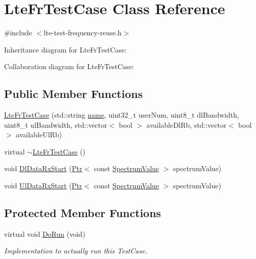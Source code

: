 \hypertarget{classLteFrTestCase}{}\section{Lte\+Fr\+Test\+Case Class Reference}
\label{classLteFrTestCase}


{\ttfamily \#include $<$lte-\/test-\/frequency-\/reuse.\+h$>$}



Inheritance diagram for Lte\+Fr\+Test\+Case\+:


Collaboration diagram for Lte\+Fr\+Test\+Case\+:
\subsection*{Public Member Functions}
\begin{DoxyCompactItemize}
\item 
\hyperlink{classLteFrTestCase_ad2462a22e785220a21669d13471669bc}{Lte\+Fr\+Test\+Case} (std\+::string \hyperlink{generate__test__data__lte__spectrum__model_8m_ab74e6bf80237ddc4109968cedc58c151}{name}, uint32\+\_\+t user\+Num, uint8\+\_\+t dl\+Bandwidth, uint8\+\_\+t ul\+Bandwidth, std\+::vector$<$ bool $>$ available\+Dl\+Rb, std\+::vector$<$ bool $>$ available\+Ul\+Rb)
\item 
virtual \hyperlink{classLteFrTestCase_a5cb1b198965df955d24cfa459cb40780}{$\sim$\+Lte\+Fr\+Test\+Case} ()
\item 
void \hyperlink{classLteFrTestCase_a01a287862bb43a1903601d6bab39eba9}{Dl\+Data\+Rx\+Start} (\hyperlink{classns3_1_1Ptr}{Ptr}$<$ const \hyperlink{classns3_1_1SpectrumValue}{Spectrum\+Value} $>$ spectrum\+Value)
\item 
void \hyperlink{classLteFrTestCase_a29a1e65e5bad38bacd7db1d539de5786}{Ul\+Data\+Rx\+Start} (\hyperlink{classns3_1_1Ptr}{Ptr}$<$ const \hyperlink{classns3_1_1SpectrumValue}{Spectrum\+Value} $>$ spectrum\+Value)
\end{DoxyCompactItemize}
\subsection*{Protected Member Functions}
\begin{DoxyCompactItemize}
\item 
virtual void \hyperlink{classLteFrTestCase_a7965b10d6951dd0e5c92d7eae09dda03}{Do\+Run} (void)
\begin{DoxyCompactList}\small\item\em Implementation to actually run this Test\+Case. \end{DoxyCompactList}\end{DoxyCompactItemize}
